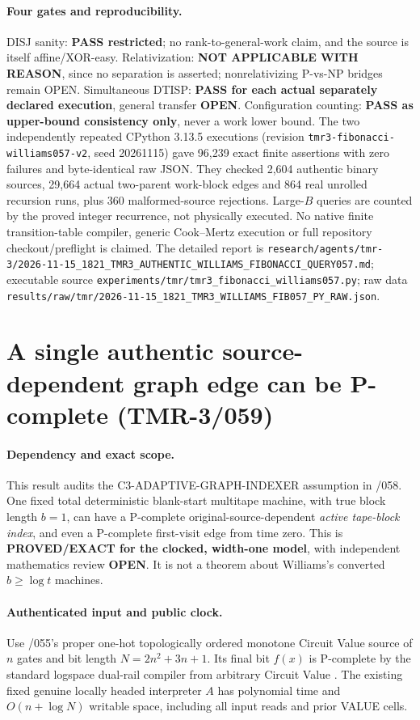 \documentclass[11pt]{article}
\begin{document}
\paragraph{Four gates and reproducibility.}
DISJ sanity: \textbf{PASS restricted}; no rank-to-general-work
claim, and the source is itself affine/XOR-easy.
Relativization: \textbf{NOT APPLICABLE WITH REASON}, since
no separation is asserted; nonrelativizing P-vs-NP bridges remain
OPEN. Simultaneous DTISP: \textbf{PASS for each actual separately
declared execution}, general transfer \textbf{OPEN}.
Configuration counting: \textbf{PASS as upper-bound consistency
only}, never a work lower bound.
The two independently repeated CPython 3.13.5 executions
(revision \texttt{tmr3-fibonacci-williams057-v2}, seed 20261115)
gave 96,239 exact finite assertions with zero failures and
byte-identical raw JSON. They checked 2,604 authentic binary
sources, 29,664 actual two-parent work-block edges and 864
real unrolled recursion runs, plus 360 malformed-source rejections.
Large-$B$ queries are counted by the proved integer recurrence,
not physically executed. No native finite transition-table
compiler, generic Cook--Mertz execution or full repository
checkout/preflight is claimed.
The detailed report is
\texttt{research/agents/tmr-3/2026-11-15\_1821\_TMR3\_AUTHENTIC\_WILLIAMS\_FIBONACCI\_QUERY057.md};
executable source
\texttt{experiments/tmr/tmr3\_fibonacci\_williams057.py};
raw data
\texttt{results/raw/tmr/2026-11-15\_1821\_TMR3\_WILLIAMS\_FIB057\_PY\_RAW.json}.

\section{A single authentic source-dependent graph edge can be P-complete (TMR-3/059)}
\paragraph{Dependency and exact scope.}
This result audits the \textsf{C3-ADAPTIVE-GRAPH-INDEXER}
assumption in /058. One fixed total deterministic
blank-start multitape machine, with true block length $b=1$,
can have a P-complete original-source-dependent \emph{active tape-block
index}, and even a P-complete first-visit edge from time zero.
This is \textbf{PROVED/EXACT for the clocked, width-one model},
with independent mathematics review \textbf{OPEN}. It is not
a theorem about Williams's converted $b\ge\log t$ machines.

\paragraph{Authenticated input and public clock.}
Use /055's proper one-hot topologically ordered monotone Circuit
Value source of $n$ gates and bit length $N=2n^2+3n+1$.
Its final bit $f(x)$ is P-complete by the standard
logspace dual-rail compiler from arbitrary Circuit Value
\cite{Ladner1975}. The existing fixed genuine locally headed
interpreter $A$ has polynomial time and $O(n+\log N)$
writable space, including all input reads and prior VALUE cells.
\end{document}
